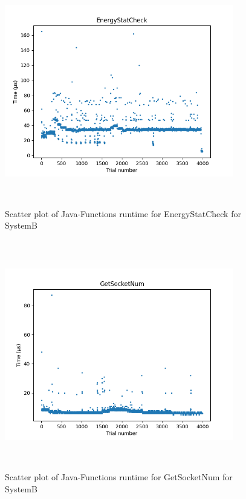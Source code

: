 \begin{figure}[H]
	\centering
	\includegraphics[width=10cm,height=10cm,keepaspectratio]{RuntimeResults_SystemB/JavaFunctions/EnergyStatCheck_scatter.png}
	\caption{Scatter plot of Java-Functions runtime for EnergyStatCheck for SystemB}
	\label{fig:Java-Functions|EnergyStatCheck|SystemB}
\end{figure}

\begin{figure}[H]
	\centering
	\includegraphics[width=10cm,height=10cm,keepaspectratio]{RuntimeResults_SystemB/JavaFunctions/GetSocketNum_scatter.png}
	\caption{Scatter plot of Java-Functions runtime for GetSocketNum for SystemB}
	\label{fig:Java-Functions|GetSocketNum|SystemB}
\end{figure}

